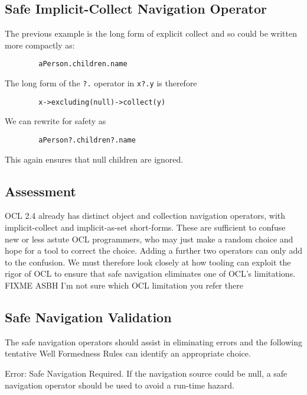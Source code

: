 \documentclass{llncs}
\begin{document}
\subsection{Safe Implicit-Collect Navigation Operator}

The previous example is the long form of explicit collect and so could be written more compactly as: 

\begin{verbatim}
        aPerson.children.name
\end{verbatim}

The long form of the \verb|?.| operator in  \verb|x?.y| is therefore

\begin{verbatim}
        x->excluding(null)->collect(y)
\end{verbatim}

We can rewrite for safety as

\begin{verbatim}
        aPerson?.children?.name
\end{verbatim}

This again ensures that null children are ignored.

\subsection{Assessment}

OCL 2.4 already has distinct object and collection navigation operators, with implicit-collect and implicit-as-set short-forms. These are sufficient to confuse new or less astute OCL programmers, who may just make a random choice and hope for a tool to correct the choice. Adding a further two operators can only add to the confusion. We must therefore look closely at how tooling can exploit the rigor of OCL to ensure that safe navigation eliminates one of OCL's limitations. FIXME ASBH I'm not sure which OCL limitation you refer there

\subsection{Safe Navigation Validation}

The safe navigation operators should assist in eliminating errors and the following tentative Well Formedness Rules can identify an appropriate choice.

Error: Safe Navigation Required. If the navigation source could be null, a safe navigation operator should be used to avoid a run-time hazard.
\end{document}
